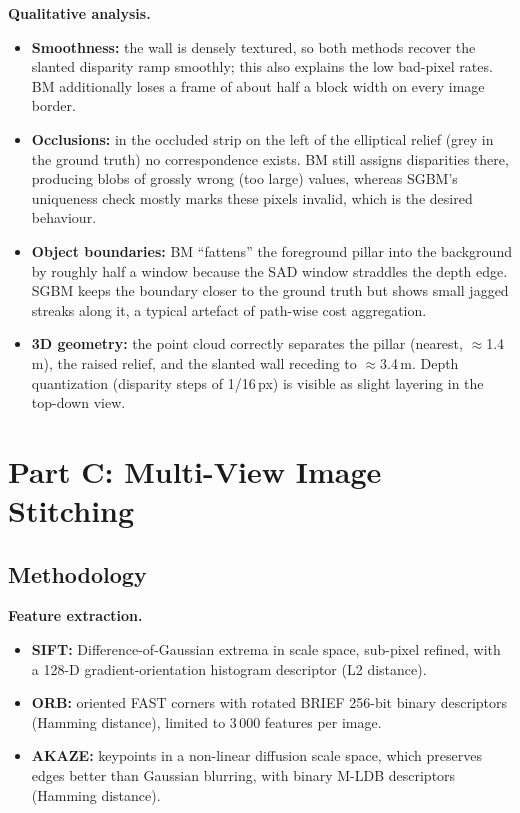 \documentclass[a4paper,12pt]{article}
\begin{document}
\textbf{Qualitative analysis.}
\begin{itemize}[leftmargin=*]
    \item \textbf{Smoothness:} the wall is densely textured, so both methods recover the slanted
          disparity ramp smoothly; this also explains the low bad-pixel rates. BM additionally
          loses a frame of about half a block width on every image border.
    \item \textbf{Occlusions:} in the occluded strip on the left of the elliptical relief (grey in the
          ground truth) no correspondence exists. BM still assigns disparities there, producing
          blobs of grossly wrong (too large) values, whereas SGBM's uniqueness check mostly marks
          these pixels invalid, which is the desired behaviour.
    \item \textbf{Object boundaries:} BM ``fattens'' the foreground pillar into the background by
          roughly half a window because the SAD window straddles the depth edge. SGBM keeps the
          boundary closer to the ground truth but shows small jagged streaks along it, a typical
          artefact of path-wise cost aggregation.
    \item \textbf{3D geometry:} the point cloud correctly separates the pillar (nearest, $\approx$1.4\,m),
          the raised relief, and the slanted wall receding to $\approx$3.4\,m. Depth quantization
          (disparity steps of 1/16\,px) is visible as slight layering in the top-down view.
\end{itemize}

\section{Part C: Multi-View Image Stitching}\label{sec:partc}
\subsection{Methodology}

\textbf{Feature extraction.}
\begin{itemize}[leftmargin=*]
    \item \textbf{SIFT:} Difference-of-Gaussian extrema in scale space, sub-pixel refined, with a
          128-D gradient-orientation histogram descriptor (L2 distance).
    \item \textbf{ORB:} oriented FAST corners with rotated BRIEF 256-bit binary descriptors
          (Hamming distance), limited to 3\,000 features per image.
    \item \textbf{AKAZE:} keypoints in a non-linear diffusion scale space, which preserves edges
          better than Gaussian blurring, with binary M-LDB descriptors (Hamming distance).
\end{itemize}
\end{document}
